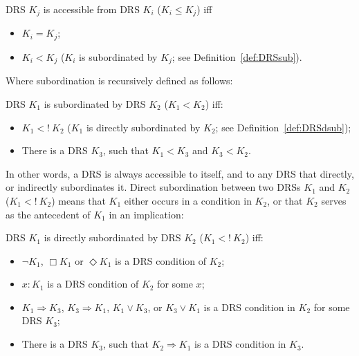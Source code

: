 \begin{definition}
DRS $K_j$ is accessible from DRS $K_i$ ($K_i \leq K_j$) iff
  \begin{itemize}
    \item $K_i = K_j$;
    \item $K_i < K_j$ ($K_i$ is subordinated by $K_j$; 
      see Definition~\ref{def:DRSsub}).
  \end{itemize}
\end{definition}

\noindent Where subordination is recursively defined as follows:

\begin{subdefinition}\label{def:DRSsub}
DRS $K_1$ is subordinated by DRS $K_2$ ($K_1 < K_2$) iff:
  \begin{itemize}
    \item $K_1 <!~K_2$ 
      ($K_1$ is directly subordinated by $K_2$; 
      see Definition~\ref{def:DRSdsub});
    \item There is a DRS $K_3$, such that $K_1 < K_3$  and $K_3 < K_2$.
  \end{itemize}
\end{subdefinition}

\noindent In other words, a DRS is always accessible to itself, and to any
DRS that directly, or indirectly subordinates it.  Direct subordination
between two DRSs $K_1$ and $K_2$ ($K_1 <!~K_2$) means that $K_1$ either
occurs in a condition in $K_2$, or that $K_2$ serves as the antecedent of
$K_1$ in an implication:

\begin{subdefinition}\label{def:DRSdsub}
DRS $K_1$ is directly subordinated by DRS $K_2$ ($K_1 <!~K_2$) iff:
  \begin{itemize}
    \item $\neg K_1$, $\Box K_1$ or $\Diamond K_1$ is a DRS condition of
      $K_2$;
    \item $x:K_1$ is a DRS condition of $K_2$ for some $x$;
    \item $K_1 \Rightarrow K_3$, $K_3 \Rightarrow K_1$, $K_1 \vee K_3$, or 
      $K_3 \vee K_1$ is a DRS condition in $K_2$ for some DRS $K_3$;
    \item There is a DRS $K_3$, such that $K_2 \Rightarrow K_1$
      is a DRS condition in $K_3$.
  \end{itemize}
\end{subdefinition}

